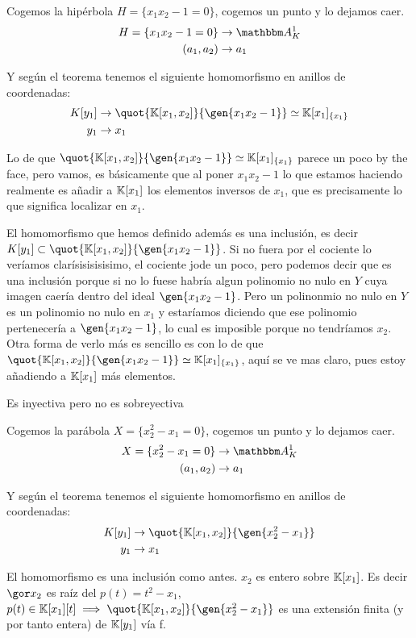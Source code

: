 	\begin{example}
		Cogemos la hipérbola $H=\{x_1x_2-1=0\}$, cogemos un punto y lo dejamos caer.
		\begin{align*}
			H=\{x_1x_2-1=0\} & \rightarrow \A_K^1 \\
			(a_1,a_2) & \rightarrow a_1
		\end{align*}

		Y según el teorema tenemos el siguiente homomorfismo en anillos de coordenadas:
		\begin{align*}
			K[y_1] & \rightarrow \quot{\K[x_1,x_2]}{\gen{x_1x_2-1}} \simeq \K[x_1]_{\{x_1\}} \\
			y_1 & \rightarrow x_1 \\
		\end{align*}

		Lo de que $\quot{\K[x_1,x_2]}{\gen{x_1x_2-1}} \simeq \K[x_1]_{\{x_1\}}$ parece un poco by the face, pero vamos, es básicamente que al poner $x_1x_2-1$ lo que estamos haciendo realmente es añadir a $\mathbb{K}[x_1]$ los elementos inversos de $x_1$, que es precisamente lo que significa localizar en $x_1$.

		El homomorfismo que hemos definido además es una inclusión, es decir $K[y_1] \subset \quot{\K[x_1,x_2]}{\gen{x_1x_2-1}}$. Si no fuera por el cociente lo veríamos clarísisisisisimo, el cociente jode un poco, pero podemos decir que es una inclusión porque si no lo fuese habría algun polinomio no nulo en $Y$ cuya imagen caería dentro del ideal $\gen{x_1x_2-1}$. Pero un polinonmio no nulo en $Y$ es un polinomio no nulo en $x_1$ y estaríamos diciendo que ese polinomio pertenecería a $\gen{x_1x_2-1}$, lo cual es imposible porque no tendríamos $x_2$.  Otra forma de verlo más es sencillo es con lo de que $\quot{\K[x_1,x_2]}{\gen{x_1x_2-1}} \simeq \K[x_1]_{\{x_1\}}$, aquí se ve mas claro, pues estoy añadiendo a $\mathbb{K}[x_1]$ más elementos.

		Es inyectiva pero no es sobreyectiva %
	\end{example}

	\begin{example}
		Cogemos la parábola $X=\{x_2^2-x_1=0\}$, cogemos un punto y lo dejamos caer.
		\begin{align*}
			X=\{x_2^2-x_1=0\} & \rightarrow \A_K^1 \\
			(a_1,a_2) & \rightarrow a_1
		\end{align*}

		Y según el teorema tenemos el siguiente homomorfismo en anillos de coordenadas:
		\begin{align*}
			K[y_1] & \rightarrow \quot{\K[x_1,x_2]}{\gen{x_2^2-x_1}} \\
			y_1 & \rightarrow x_1
		\end{align*}

		El homomorfismo es una inclusión como antes. $x_2$ es entero sobre $\mathbb{K}[x_1]$. Es decir $\cls{x_2}$ es raíz del $p(t)=t^2-x_1$, $p(t)\in \K[x_1][t] \implies \quot{\K[x_1,x_2]}{\gen{x_2^2-x_1}}$ es una extensión finita (y por tanto entera) de $\mathbb{K}[y_1]$ vía f.
	\end{example}

